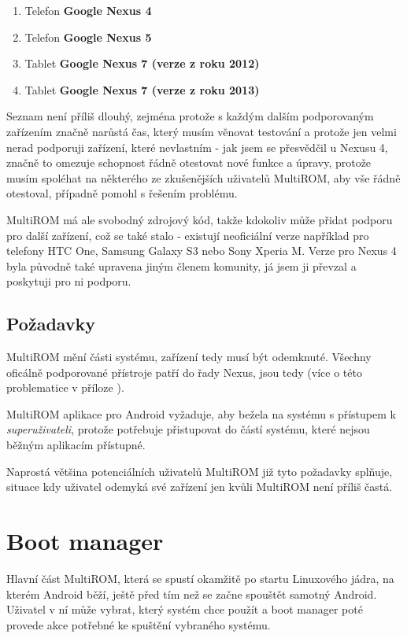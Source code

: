 \documentclass[12pt, a4paper, oneside]{article}
\newcommand{\B}{\textbf} %
\newcommand{\It}{\textit}  %
\begin{document}
\begin{enumerate}
    \item Telefon \B{Google Nexus 4}
    \item Telefon \B{Google Nexus 5}
    \item Tablet \B{Google Nexus 7 (verze z roku 2012)}
    \item Tablet \B{Google Nexus 7 (verze z roku 2013)}
\end{enumerate}

Seznam není příliš dlouhý, zejména protože s každým dalším podporovaným zařízením značně narůstá čas, který musím věnovat testování a protože jen velmi nerad podporuji zařízení, které nevlastním - jak jsem se přesvědčil u Nexusu 4, značně to omezuje schopnost řádně otestovat nové funkce a úpravy, protože musím spoléhat na některého ze zkušenějších uživatelů MultiROM, aby vše řádně otestoval, případně pomohl s řešením problému.

MultiROM má ale svobodný zdrojový kód, takže kdokoliv může přidat podporu pro další zařízení, což se také stalo - existují neoficiální verze například pro telefony HTC One, Samsung Galaxy S3 nebo Sony Xperia M. Verze pro Nexus 4 byla původně také upravena jiným členem komunity, já jsem ji převzal a poskytuji pro ni podporu.

\subsection{Požadavky}
MultiROM mění části systému, zařízení tedy musí být odemknuté. Všechny oficálně podporované přístroje patří do řady Nexus, jsou tedy  (více o této problematice v příloze ).

MultiROM aplikace pro Android vyžaduje, aby bežela na systému s přístupem k \It{superuživateli}, protože potřebuje přistupovat do částí systému, které nejsou běžným aplikacím přístupné.

Naprostá většina potenciálních uživatelů MultiROM již tyto požadavky splňuje, situace kdy uživatel odemyká své zařízení jen kvůli MultiROM není příliš častá.

\newpage
\section{Boot manager}
Hlavní část MultiROM, která se spustí okamžitě po startu Linuxového jádra, na kterém Android běží, ještě před tím než se začne spouštět samotný Android. Uživatel v ní může vybrat, který systém chce použít a boot manager poté provede akce potřebné ke spuštění vybraného systému.
\end{document}
